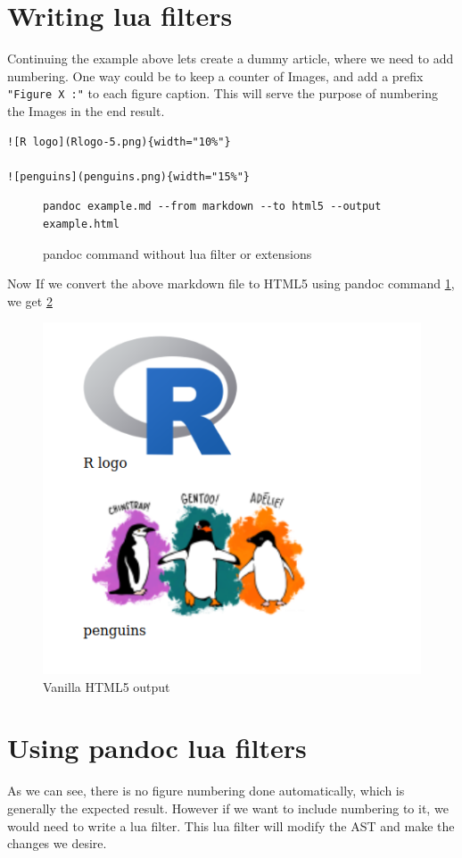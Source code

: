 \section{Writing lua filters}

Continuing the example above lets create a dummy article, where we need to add
numbering. One way could be to keep a counter of Images, and add a prefix \verb|"Figure X :"|
to each figure caption. This will serve the purpose of numbering the Images in the end result.

\begin{verbatim}
![R logo](Rlogo-5.png){width="10%"}

![penguins](penguins.png){width="15%"}

\end{verbatim}

\begin{figure}[htbp]
\begin{verbatim}
pandoc example.md --from markdown --to html5 --output example.html
\end{verbatim}
\caption{pandoc command without lua filter or extensions}
\label{code:2}
\end{figure}

Now If we convert the above markdown file to HTML5 using pandoc command \ref{code:2}, we get \ref{fig:1}


\begin{figure}[!htbp]
\centering
\includegraphics[width=0.5\linewidth]{example.png}
\caption{Vanilla HTML5 output}
\label{fig:1}
\end{figure}

\section{Using pandoc lua filters}

As we can see, there is no figure numbering done automatically, which is generally
the expected result. However if we want to include numbering to it, we would need
to write a lua filter. This lua filter will modify the AST and make the changes we 
desire.

